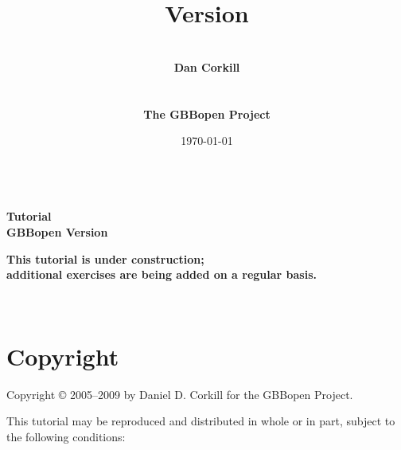 \documentclass[10pt,twoside,english,pdftex]{article}
\title{\vspace{3in}{\LARGE\textbf{GBBopen Tutorial}}\\[14pt] 
{\Large\textbf{Version \gbbopenversion}}}
\author{\vspace{1in}~\\{\Large\textbf{Dan Corkill}}\\~\\~\\
  {\Large\textbf{The GBBopen Project}}\\[4pt]
  {\large\textbf{\xsitelink{http://GBBopen.org}{http://GBBopen.org}}}}
\date{\today\\[4pt] \hhmm~\timezone}
\newcommand{\inprogress}{\vfill\textcolor{darkergray}{\textsf{\textbf{This
        tutorial is under construction;\\additional exercises are being added
        on a regular basis.}}}}
\begin{document}
\T{}
\T\pagestyle{plain}
\T\thispagestyle{empty}
\T\raggedright
\T\sloppy
\T{}\baselineskip
\T\parindent=0pt
\T\maketitle
\T\renewcommand{\headrulewidth}{0pt}

\T\begin{ifhtml}
{\LARGE\bf Tutorial}\\
{\large\bf GBBopen Version \gbbopenversion}
\T\end{ifhtml}

\begin{center}
\inprogress\\
\end{center}


\T\begin{ifhtml}
  \label{sec:introduction}%
  
  \setcounter{htmlautomenu}{0}
\T\end{ifhtml}

\T\thispagestyle{empty}


\T\newpage
\T~
\T\vfill
\W{}
\W\section*{Copyright}

Copyright \copyright{} 2005--2009 by Daniel D. Corkill for the
GBBopen Project.

This tutorial may be reproduced and distributed in whole or in
part, subject to the following conditions: 
\end{document}
